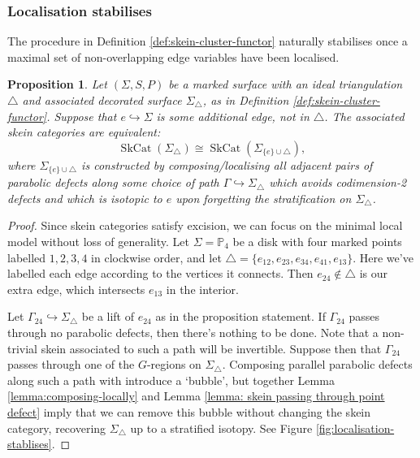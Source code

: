 \documentclass[a4paper]{article}
\numberwithin{equation}{section}
\newtheorem{proposition}[counter]{Proposition}
\newcommand{\1}{{\mathrm{1}\mkern-4mu{\mathchoice{}{}{\mskip-0.5mu}{\mskip-1mu}}\mathrm{l}}}
\newcommand{\PP}{\mathbb{P}}
\DeclareMathOperator{\SkCat}{SkCat}
\begin{document}
\subsubsection{Localisation stabilises}\label{sec:localisation-stablises}

The procedure in Definition \ref{def:skein-cluster-functor} naturally stabilises once a maximal set of non-overlapping edge variables have been localised.

\begin{proposition}\label{prop:localisation-stablises}
  Let $(\Sigma,S,P)$ be a marked surface with an ideal triangulation $\triangle$ and associated decorated surface $\Sigma_\triangle$, as in Definition \ref{def:skein-cluster-functor}. Suppose that $e \hookrightarrow \Sigma$ is some additional edge, not in $\triangle$.
  The associated skein categories are equivalent:
  \begin{equation}
    \SkCat(\Sigma_\triangle) \cong \SkCat(\Sigma_{\{e\}\cup \triangle}),
  \end{equation}
  where $\Sigma_{\{e\}\cup\triangle}$ is constructed by composing/localising all adjacent pairs of parabolic defects along some choice of path $\Gamma \hookrightarrow \Sigma_\triangle$ which avoids codimension-2 defects and which is isotopic to $e$ upon forgetting the stratification on $\Sigma_\triangle$.
\end{proposition}
\begin{proof}
  Since skein categories satisfy excision, we can focus on the minimal local model without loss of generality.
  Let $\Sigma = \PP_4$ be a disk with four marked points labelled $1,2,3,4$ in clockwise order, and let $\triangle = \{e_{12},e_{23},e_{34},e_{41},e_{13}\}$. Here we've labelled each edge according to the vertices it connects.
  Then $e_{24} \not\in \triangle$ is our extra edge, which intersects $e_{13}$ in the interior. 

  Let $\Gamma_{24} \hookrightarrow \Sigma_\triangle$ be a lift of $e_{24}$ as in the proposition statement.
  If $\Gamma_{24}$ passes through no parabolic defects, then there's nothing to be done. Note that a non-trivial skein associated to such a path will be invertible.
  Suppose then that $\Gamma_{24}$ passes through one of the $G$-regions on $\Sigma_{\triangle}$.
  Composing parallel parabolic defects along such a path with introduce a `bubble', but together Lemma \ref{lemma:composing-locally} and Lemma \ref{lemma: skein passing through point defect} imply that we can remove this bubble without changing the skein category, recovering $\Sigma_\triangle$ up to a stratified isotopy.
See Figure \ref{fig:localisation-stablises}.
\end{proof}
\end{document}
